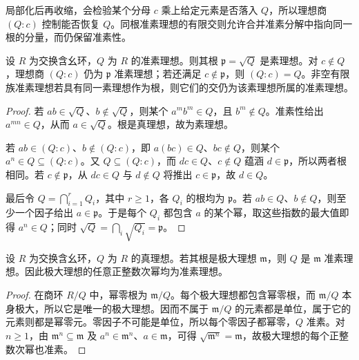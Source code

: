 \ProseParagraphBreak
局部化后再收缩，会检验某个分母 \(c\) 乘上给定元素是否落入 \(Q\)，所以理想商 \((Q:c)\) 控制能否恢复 \(Q\)。同根准素理想的有限交则允许合并准素分解中指向同一根的分量，而仍保留准素性。

\begin{proposition}\label{b3:prop:primary-radical-colon}
	设 \(R\) 为交换含幺环，\(Q\) 为 \(R\) 的准素理想。则其根 \(\mathfrak p=\sqrt Q\) 是素理想。对 \(c\notin Q\)，理想商 \((Q:c)\) 仍为 \(\mathfrak p\) 准素理想；若还满足 \(c\notin\mathfrak p\)，则 \((Q:c)=Q\)。非空有限族准素理想若具有同一素理想作为根，则它们的交仍为该素理想所属的准素理想。
\end{proposition}
\begin{proof}
	若 \(ab\in\sqrt Q\)、\(b\notin\sqrt Q\)，则某个 \(a^m b^m\in Q\)，且 \(b^m\notin Q\)。准素性给出 \(a^{mn}\in Q\)，从而 \(a\in\sqrt Q\)。根是真理想，故为素理想。

	若 \(ab\in(Q:c)\)、\(b\notin(Q:c)\)，即 \(a(bc)\in Q\)、\(bc\notin Q\)，则某个 \(a^n\in Q\subseteq(Q:c)\)。又 \(Q\subseteq(Q:c)\)，而 \(dc\in Q\)、\(c\notin Q\) 蕴涵 \(d\in\mathfrak p\)，所以两者根相同。若 \(c\notin\mathfrak p\)，从 \(dc\in Q\) 与 \(d\notin Q\) 将推出 \(c\in\mathfrak p\)，故 \(d\in Q\)。

	最后令 \(Q=\bigcap_{i=1}^rQ_i\)，其中 \(r\ge1\)，各 \(Q_i\) 的根均为 \(\mathfrak p\)。若 \(ab\in Q\)、\(b\notin Q\)，则至少一个因子给出 \(a\in\mathfrak p\)。于是每个 \(Q_i\) 都包含 \(a\) 的某个幂，取这些指数的最大值即得 \(a^n\in Q\)；同时 \(\sqrt Q=\bigcap_i\sqrt{Q_i}=\mathfrak p\)。
\end{proof}

\begin{proposition}\label{b3:prop:maximal-radical-primary}
	设 \(R\) 为交换含幺环，\(Q\) 为 \(R\) 的真理想。若其根是极大理想 \(\mathfrak m\)，则 \(Q\) 是 \(\mathfrak m\) 准素理想。因此极大理想的任意正整数次幂均为准素理想。
\end{proposition}
\begin{proof}
	在商环 \(R/Q\) 中，幂零根为 \(\mathfrak m/Q\)。每个极大理想都包含幂零根，而 \(\mathfrak m/Q\) 本身极大，所以它是唯一的极大理想。因而不属于 \(\mathfrak m/Q\) 的元素都是单位，属于它的元素则都是幂零元。零因子不可能是单位，所以每个零因子都幂零，\(Q\) 准素。对 \(n\ge1\)，由 \(\mathfrak m^n\subseteq\mathfrak m\) 及 \(a^n\in\mathfrak m^n\)、\(a\in\mathfrak m\)，可得 \(\sqrt{\mathfrak m^n}=\mathfrak m\)，故极大理想的每个正整数次幂也准素。
\end{proof}

